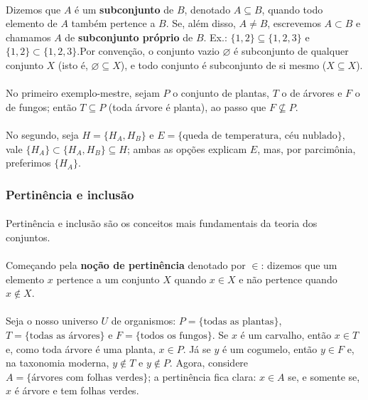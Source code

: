 \documentclass[12pt,a4paper]{article}
\begin{document}
\paragraph{}
Dizemos que \(A\) é um \textbf{subconjunto} de \(B\), denotado \(A \subseteq B\), quando todo elemento de \(A\) também pertence a \(B\). Se, além disso, \(A \neq B\), escrevemos \(A \subset B\) e chamamos \(A\) de \textbf{subconjunto próprio} de \(B\). Ex.: \( \{1,2\} \subseteq \{1,2,3\} \) e \( \{1,2\} \subset \{1,2,3\} \).Por convenção, o conjunto vazio \(\varnothing\) é subconjunto de qualquer conjunto \(X\) (isto é, \(\varnothing \subseteq X\)), e todo conjunto é subconjunto de si mesmo (\(X \subseteq X\)).

\paragraph{}
No primeiro exemplo-mestre, sejam \(P\) o conjunto de plantas, \(T\) o de árvores e \(F\) o de fungos; então \(T \subseteq P\) (toda árvore é planta), ao passo que \(F \not\subseteq P\).

\paragraph{}
No segundo, seja \(H=\{H_A, H_B\}\) e \(E=\{\text{queda de temperatura},\, \text{céu nublado}\}\), vale \(\{H_A\} \subset \{H_A,H_B\} \subseteq H\); ambas as opções explicam \(E\), mas, 
por parcimônia, preferimos \(\{H_A\}\).

\subsubsection{Pertinência e inclusão}
\paragraph{}

Pertinência e inclusão são os conceitos mais fundamentais da teoria dos conjuntos. 

\paragraph{}
Começando pela \textbf{noção de pertinência} denotado por \(\in\): dizemos que um elemento \(x\) pertence a um conjunto \(X\) quando \(x \in X\) e não pertence quando \(x \notin X\).

\paragraph{}
Seja o nosso universo \(U\) de organismos: \(P=\{\text{todas as plantas}\}\), \(T=\{\text{todas as árvores}\}\) e \(F=\{\text{todos os fungos}\}\). Se \(x\) é um carvalho, então \(x\in T\) e, como toda árvore é uma planta, \(x\in P\). Já se \(y\) é um cogumelo, então \(y\in F\) e, na taxonomia moderna, \(y\notin T\) e \(y\notin P\). Agora, considere \(A=\{\text{árvores com folhas verdes}\}\); a pertinência fica clara: \(x\in A\) se, e somente se, \(x\) é árvore e tem folhas verdes.
\end{document}

